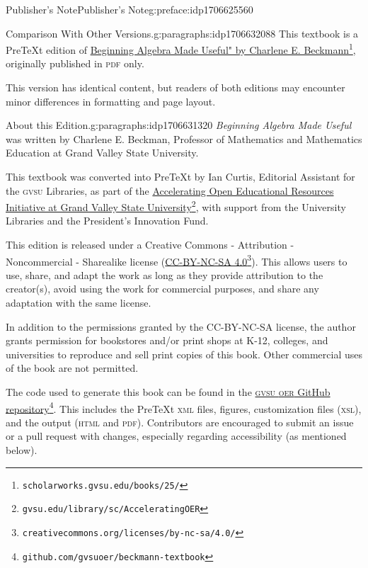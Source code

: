 \documentclass[oneside,10pt,]{book}
\newcommand{\initialism}[1]{\textsc{\MakeLowercase{#1}}}
\newcommand{\pubtitle}[1]{\textsl{#1}}
\numberwithin{equation}{chapter}
\begin{document}
\begin{preface}{Publisher's Note}{}{Publisher's Note}{}{}{g:preface:idp1706625560}
\begin{paragraphs}{Comparison With Other Versions.}{g:paragraphs:idp1706632088}%
This textbook is a PreTeXt edition of \href{https://scholarworks.gvsu.edu/books/25/}{Beginning Algebra Made Useful" by Charlene E. Beckmann}\footnote{\nolinkurl{scholarworks.gvsu.edu/books/25/}\label{g:fn:idp1706627608}}, originally published in \initialism{PDF} only.%
\par
This version has identical content, but readers of both editions may encounter minor differences in formatting and page layout.%
\end{paragraphs}%
\begin{paragraphs}{About this Edition.}{g:paragraphs:idp1706631320}%
\pubtitle{Beginning Algebra Made Useful} was written by Charlene E. Beckman, Professor of Mathematics and Mathematics Education at Grand Valley State University.%
\par
This textbook was converted into PreTeXt by Ian Curtis, Editorial Assistant for the \initialism{GVSU} Libraries, as part of the \href{https://www.gvsu.edu/library/sc/AcceleratingOER}{Accelerating Open Educational Resources Initiative at Grand Valley State University}\footnote{\nolinkurl{gvsu.edu/library/sc/AcceleratingOER}\label{g:fn:idp1706629400}}, with support from the University Libraries and the President's Innovation Fund.%
\par
This edition is released under a Creative Commons - Attribution - Noncommercial - Sharealike license (\href{https://creativecommons.org/licenses/by-nc-sa/4.0/}{CC-BY-NC-SA 4.0}\footnote{\nolinkurl{creativecommons.org/licenses/by-nc-sa/4.0/}\label{g:fn:idp1706631448}}). This allows users to use, share, and adapt the work as long as they provide attribution to the creator(s), avoid using the work for commercial purposes, and share any adaptation with the same license.%
\par
In addition to the permissions granted by the CC-BY-NC-SA license, the author grants permission for bookstores and\slash{}or print shops at K-12, colleges, and universities to reproduce and sell print copies of this book. Other commercial uses of the book are not permitted.%
\par
The code used to generate this book can be found in the \href{https://github.com/gvsuoer/beckmann-textbook}{\initialism{GVSU} \initialism{OER} GitHub repository}\footnote{\nolinkurl{github.com/gvsuoer/beckmann-textbook}\label{g:fn:idp1706635544}}. This includes the PreTeXt \initialism{XML} files, figures, customization files (\initialism{XSL}), and the output (\initialism{HTML} and \initialism{PDF}). Contributors are encouraged to submit an issue or a pull request with changes, especially regarding accessibility (as mentioned below).%

\end{paragraphs}
\end{preface}
\end{document}
